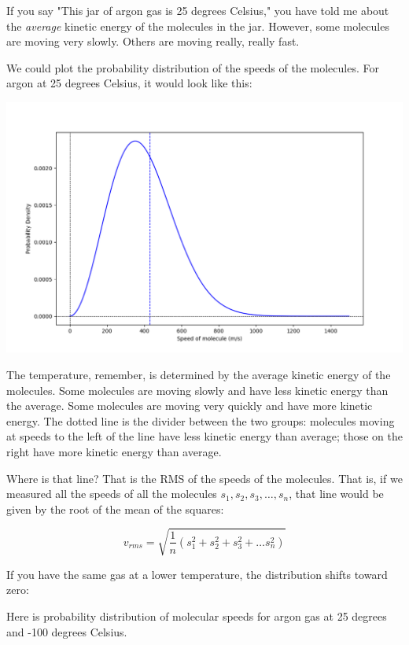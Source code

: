If you say "This jar of argon gas is 25 degrees Celsius,"  you have told me about the \emph{average} kinetic energy of the molecules in the jar.  
However,  some molecules are moving very slowly.  Others are moving really,  really fast. 

We could plot the probability distribution of the speeds of the molecules.  For argon at 25 degrees Celsius,  it would look like this:

\includegraphics[width=\textwidth]{ar_plot.png}

The temperature,  remember,  is determined by the average kinetic energy of the molecules.  Some molecules are moving slowly and have less kinetic energy than the average.  Some molecules are moving very quickly and have more kinetic energy.  The dotted line is the divider between the two groups: molecules moving at speeds to the left of the line have less kinetic energy than average; those on the right have more kinetic energy than average.

Where is that line?  That is the RMS of the speeds of the molecules.  That is, if we measured all the speeds of all the molecules  $s_1, s_2, s_3, \ldots, s_n$, that line would be given by the root of the mean of the squares:

$$v_{rms} = \sqrt{\frac{1}{n} \left( s_1^2 + s_2^2 + s_3^2 + \ldots s_n^2 \right)}$$

If you have the same gas at a lower temperature, the distribution shifts toward zero:

Here is probability distribution of molecular speeds for argon gas at 25 degrees and -100 degrees Celsius.

